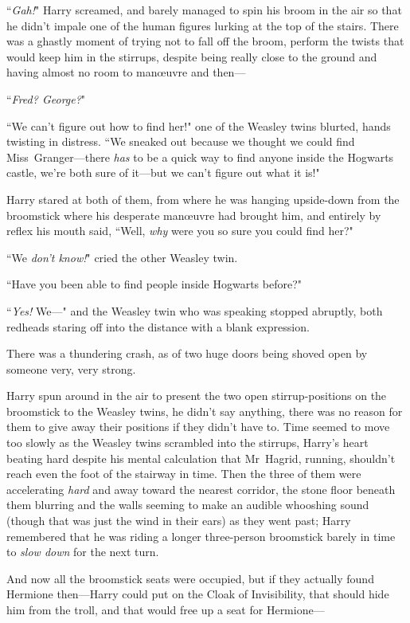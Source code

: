 ``\emph{Gah!}" Harry screamed, and barely managed to spin his broom in the air so that he didn't impale one of the human figures lurking at the top of the stairs. There was a ghastly moment of trying not to fall off the broom, perform the twists that would keep him in the stirrups, despite being really close to the ground and having almost no room to manœuvre and then—

``\emph{Fred? George?}"

``We can't figure out how to find her!" one of the Weasley twins blurted, hands twisting in distress. ``We sneaked out because we thought we could find Miss~Granger—there \emph{has} to be a quick way to find anyone inside the Hogwarts castle, we're both sure of it—but we can't figure out what it is!"

Harry stared at both of them, from where he was hanging upside-down from the broomstick where his desperate manœuvre had brought him, and entirely by reflex his mouth said, ``Well, \emph{why} were you so sure you could find her?"

``We \emph{don't know!}" cried the other Weasley twin.

``Have you been able to find people inside Hogwarts before?"

``\emph{Yes!} We—" and the Weasley twin who was speaking stopped abruptly, both redheads staring off into the distance with a blank expression.

There was a thundering crash, as of two huge doors being shoved open by someone very, very strong.

Harry spun around in the air to present the two open stirrup-positions on the broomstick to the Weasley twins, he didn't say anything, there was no reason for them to give away their positions if they didn't have to. Time seemed to move too slowly as the Weasley twins scrambled into the stirrups, Harry's heart beating hard despite his mental calculation that Mr~Hagrid, running, shouldn't reach even the foot of the stairway in time. Then the three of them were accelerating \emph{hard} and away toward the nearest corridor, the stone floor beneath them blurring and the walls seeming to make an audible whooshing sound (though that was just the wind in their ears) as they went past; Harry remembered that he was riding a longer three-person broomstick barely in time to \emph{slow down} for the next turn.

And now all the broomstick seats were occupied, but if they actually found Hermione then—Harry could put on the Cloak of Invisibility, that should hide him from the troll, and that would free up a seat for Hermione—

